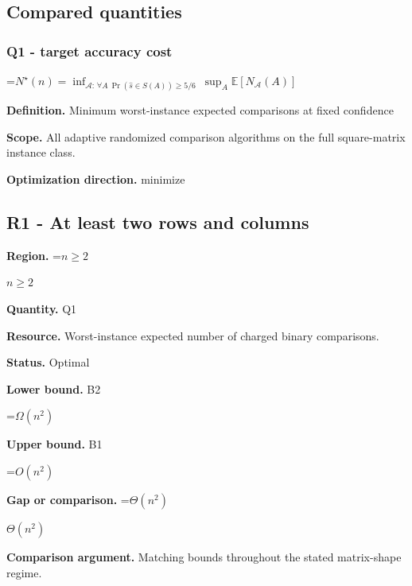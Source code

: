 \documentclass[10pt,a4paper]{article}
\newcommand{\AtlasMath}[1]{\par\begingroup\centering\setbox0=\hbox{$\displaystyle #1$}\ifdim\wd0>1.4\linewidth\typeout{ATLAS WIDE FORMULA: \the\wd0}\fi\ifdim\wd0>\linewidth\resizebox{\linewidth}{!}{\box0}\else\box0\fi\par\endgroup}
\newcommand{\AtlasInlineMath}[1]{\begingroup\setbox0=\hbox{$#1$}\ifdim\wd0>.4\linewidth\endgroup\AtlasMath{#1}\else\endgroup$#1$\fi}
\begin{document}
\subsection{Compared quantities}


\subsubsection{Q1 - target accuracy cost}


\AtlasMath{N^\star(n)=\inf_{\mathcal A:\,\forall A\ \Pr(\widehat s\in S(A))\ge5/6}\ \sup_A\mathbb E[N_{\mathcal A}(A)]}


\textbf{Definition.} Minimum worst-instance expected comparisons at fixed confidence



\textbf{Scope.} All adaptive randomized comparison algorithms on the full square-matrix instance class.



\textbf{Optimization direction.} minimize



\subsection{R1 - At least two rows and columns}


\textbf{Region.} \AtlasInlineMath{n\ge2}



\textbf{Quantity.} Q1



\textbf{Resource.} Worst-instance expected number of charged binary comparisons.



\textbf{Status.} Optimal



\textbf{Lower bound.} B2



\AtlasMath{\Omega(n^2)}


\textbf{Upper bound.} B1



\AtlasMath{O(n^2)}


\textbf{Gap or comparison.} \AtlasInlineMath{\Theta(n^2)}



\textbf{Comparison argument.} Matching bounds throughout the stated matrix-shape regime.
\end{document}
